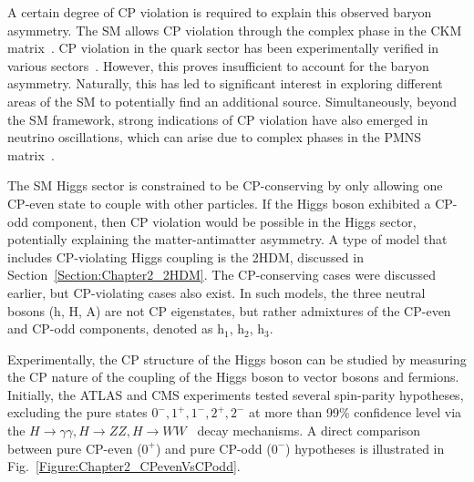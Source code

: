 A certain degree of CP violation is required to explain this observed baryon asymmetry. The \ac{SM} allows CP violation through the complex phase in the CKM matrix~\cite{CKM_1,CKM_2}. CP violation in the quark sector has been experimentally verified in various sectors~\cite{CP_QuarkSector_1, CP_QuarkSector_2, CP_QuarkSector_3, CP_QuarkSector_4, 
CP_QuarkSector_5, CP_QuarkSector_6, CP_QuarkSector_7, CP_QuarkSector_8, 
CP_QuarkSector_9, CP_QuarkSector_10, CP_QuarkSector_11, CP_QuarkSector_12, 
CP_QuarkSector_13, CP_QuarkSector_14}. However, this proves insufficient to account for the baryon asymmetry. 
Naturally, this has led to significant interest in exploring different areas of the \ac{SM} to potentially find an additional source. Simultaneously, beyond the \ac{SM} framework, strong indications of CP violation have also emerged in neutrino oscillations, which can arise due to complex phases in the PMNS matrix~\cite{Neutrino_Oscillations,CP_Neutrino_Oscillations}.

The \ac{SM} Higgs sector is constrained to be CP-conserving by only allowing one CP-even state to couple with other particles. If the Higgs boson exhibited a CP-odd component, then CP violation would be possible in the Higgs sector, potentially explaining the matter-antimatter asymmetry. A type of model that includes CP-violating Higgs coupling is the 2HDM, discussed in Section~\ref{Section:Chapter2_2HDM}. The CP-conserving cases were discussed earlier, but CP-violating cases also exist. In such models, the three neutral bosons (h, H, A) are not CP eigenstates, but rather admixtures of the CP-even and CP-odd components, denoted as h$_1$, h$_2$, h$_3$.

Experimentally, the CP structure of the Higgs boson can be studied by measuring the CP nature of the coupling of the Higgs boson to vector bosons and fermions. Initially, the ATLAS and \ac{CMS} experiments tested several spin-parity hypotheses, excluding the pure states $0^-,1^+,1^-,2^+,2^-$ at more than 99\% confidence level via the $H\to \gamma\gamma, H\to ZZ, H\to WW$~\cite{CP_constraints_1,CP_constraints_2,CP_constraints_3} decay mechanisms. A direct comparison between pure CP-even ($0^+$) and pure CP-odd ($0^-$) hypotheses is illustrated in Fig.~\ref{Figure:Chapter2_CPevenVsCPodd}. 

